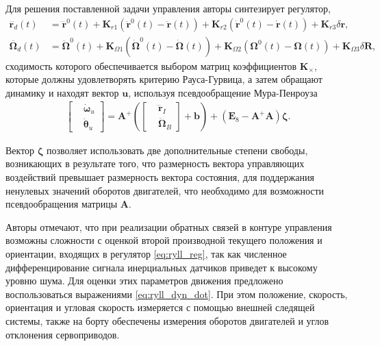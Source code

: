 Для решения поставленной задачи управления авторы синтезирует регулятор,
\begin{equation} \label{eq:ryll_reg}
\begin{aligned}
\dddot{\bm{r}_d}(t)&=
\dddot{\bm{r}}^0(t) +
\bm{K}_{r1}(\ddot{\bm{r}}^0(t) - \ddot{\bm{r}}(t)) +
\bm{K}_{r2}(\dot{\bm{r}}^0(t) - \dot{\bm{r}}(t)) + 
\bm{K}_{r3}\delta \bm r,
\\
\ddot{\bm{\Omega}_d}(t)&=
\ddot{\bm{\Omega}}^0(t)
+ \bm{K}_{\Omega1}(\dot{\bm{\Omega}}^0(t)-\dot{\bm{\Omega}}(t))
+ \bm{K}_{\Omega2}(\bm{\Omega}^0(t)-\bm{\Omega}(t))
+ \bm{K}_{\Omega3}\delta\bm{R},
\end{aligned}
\end{equation}
сходимость которого обеспечивается выбором матриц коэффициентов $\bm K_{\times}$, которые должны удовлетворять критерию Рауса-Гурвица, а затем обращают динамику и находят вектор $\bm u$, используя псевдообращение Мура-Пенроуза \cite{Barata01}
\begin{equation} \label{eq:ryll_inversed}
\begin{aligned}
\begin{bmatrix}
&\dot{\bm \omega}_u
\\
&\dot{\bm \theta}_u
\end{bmatrix}
=
\bm A^+ \left(
\begin{bmatrix}
&\dddot{\bm r}_I
\\
&\ddot{\bm \Omega}_B
\end{bmatrix}
+
\bm b
\right)
+
(\bm E_8 - \bm A^+ \bm A) \bm \zeta.
\end{aligned}
\end{equation}

Вектор $\bm \zeta$ позволяет использовать две дополнительные степени свободы, возникающих в результате того, что размерность вектора управляющих воздействий превышает размерность вектора состояния, для поддержания ненулевых значений оборотов двигателей, что необходимо для возможности псевдообращения матрицы $\bm A$.

Авторы отмечают, что при реализации обратных связей в контуре управления возможны сложности
с оценкой второй производной текущего положения и ориентации, входящих в регулятор \eqref{eq:ryll_reg},
так как численное дифференцирование сигнала инерциальных датчиков приведет к высокому уровню шума.
Для оценки этих параметров движения предложено воспользоваться выражениями \eqref{eq:ryll_dyn_dot}.
При этом положение, скорость, ориентация и угловая скорость
измеряется с помощью внешней следящей системы,
также на борту обеспечены измерения оборотов двигателей и углов отклонения сервоприводов.

